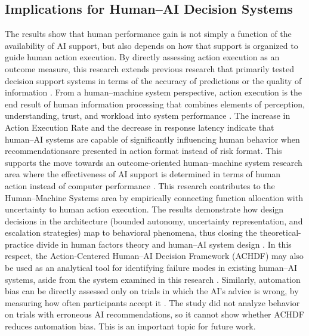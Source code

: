 \documentclass[journal]{IEEEtran}
\theoremstyle{plain}
\theoremstyle{definition}
\providecommand{\DIFaddtex}[1]{{\protect\color{blue} \sf #1}} %
\providecommand{\DIFdeltex}[1]{{\protect\color{red} \scriptsize #1}} %
\providecommand{\DIFaddbegin}{} %
\providecommand{\DIFaddend}{} %
\providecommand{\DIFdelbegin}{} %
\providecommand{\DIFdelend}{} %
\providecommand{\DIFadd}[1]{\texorpdfstring{\DIFaddtex{#1}}{#1}} %
\providecommand{\DIFdel}[1]{\texorpdfstring{\DIFdeltex{#1}}{}} %
\newcommand{\DIFscaledelfig}{0.5}
\newlength{\DIFdelgraphicswidth} %
\newlength{\DIFdelgraphicsheight} %
\newcommand{\DIFaddincludegraphics}[2][]{{\color{blue}\fbox{\DIFOincludegraphics[#1]{#2}}}} %
\newcommand{\DIFdelincludegraphics}[2][]{%
\sbox{\DIFdelgraphicsbox}{\DIFOincludegraphics[#1]{#2}}%
\settoboxwidth{\DIFdelgraphicswidth}{\DIFdelgraphicsbox} %
\settoboxtotalheight{\DIFdelgraphicsheight}{\DIFdelgraphicsbox} %
\scalebox{\DIFscaledelfig}{%
\parbox[b]{\DIFdelgraphicswidth}{\usebox{\DIFdelgraphicsbox}\\[-\baselineskip] \rule{\DIFdelgraphicswidth}{0em}}\llap{\resizebox{\DIFdelgraphicswidth}{\DIFdelgraphicsheight}{%
\setlength{\unitlength}{\DIFdelgraphicswidth}%
\begin{picture}(1,1)%
\thicklines\linethickness{2pt} %
{\color[rgb]{1,0,0}\put(0,0){\framebox(1,1){}}}%
{\color[rgb]{1,0,0}\put(0,0){\line( 1,1){1}}}%
{\color[rgb]{1,0,0}\put(0,1){\line(1,-1){1}}}%
\end{picture}%
}\hspace*{3pt}}} %
} %
\DeclareRobustCommand{\DIFaddbegin}{\DIFOaddbegin \let\includegraphics\DIFaddincludegraphics} %
\DeclareRobustCommand{\DIFaddend}{\DIFOaddend \let\includegraphics\DIFOincludegraphics} %
\DeclareRobustCommand{\DIFdelbegin}{\DIFOdelbegin \let\includegraphics\DIFdelincludegraphics} %
\DeclareRobustCommand{\DIFdelend}{\DIFOaddend \let\includegraphics\DIFOincludegraphics} %
\begin{document}
\DIFdelbegin \subsection{\DIFdel{Implications for Human--AI Decision Systems}}
\addtocounter{subsection}{-1}%
\DIFdel{The results show that human performance gain is not simply a function of the availability of AI support, but also depends on how that support is organized to guide human action execution. By directly assessing action execution as an outcome measure, this research extends previous research that primarily tested decision support systems in terms of the accuracy of predictions or the quality of information \cite{Lai2023FAccT,Muller2022CHIWORK,Yang2022THMSReview}.
From a human--machine system perspective, action execution is the end result of human information processing that combines elements of perception, understanding, trust, and workload into system performance \cite{Hodgson2013THMS,Bach2024Access}. The increase in Action Execution Rate and the decrease in response latency indicate that human--AI systems are capable of significantly influencing human behavior when recommendationsare presented in action format instead of risk format. This supports the move towards an outcome-oriented human--machine system research area where the effectiveness of AI support is determined in terms of human action instead of computer performance \cite{Lai2023FAccT,Yang2022THMSReview}.
This research contributes to the Human--Machine Systems area by empirically connecting function allocation with uncertainty to human action execution.
The results demonstrate how design decisions in the architecture (bounded autonomy, uncertainty representation, and escalation strategies) map to behavioral phenomena, thus closing the theoretical-practice divide in human factors theory and human--AI system design \cite{Bach2024Access,Assaad2023TAS,Zhang2022THMS}. In this respect, the Action-Centered Human--AI Decision Framework (ACHDF) may also be used as an analytical tool for identifying failure modes in existing human--AI systems, aside from the system examined in this research \cite{Yang2022THMSReview,Lai2023FAccT}.
}\DIFdelend \DIFaddbegin \DIFadd{Similarly, automation bias can be directly assessed only on trials in which the AI's advice is wrong, by measuring how often participants accept it \cite{Parasuraman2010}. The study did not analyze behavior on trials with erroneous AI recommendations, so it cannot show whether ACHDF reduces automation bias. This is an important topic for future work.
}\DIFaddend 
\end{document}
